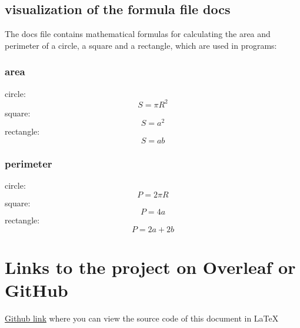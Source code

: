 \documentclass[12pt]{article}
\begin{document}
\subsection{visualization of the formula file docs}
The docs file contains mathematical formulas for calculating the area and perimeter of a circle, a square and a rectangle, which are used in programs: \\

\subsubsection{area}
circle: $$S = \pi R^{2}$$
square: $$S = a^{2}$$
rectangle: $$S = ab$$
\newpage
\subsubsection{perimeter}
circle: $$P = 2 \pi R$$
square: $$P = 4a$$
rectangle: $$P = 2a + 2b$$

\label{subsec:pythagoras}

\section{Links to the project on Overleaf or GitHub}
\href{}{Github link} where you can view the source code of this document in LaTeX
\end{document}
